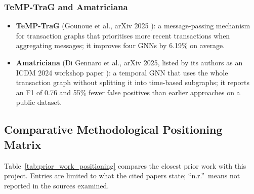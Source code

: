 \documentclass[11pt,a4paper]{article}
\begin{document}
\subsubsection{TeMP-TraG and Amatriciana}
\begin{itemize}[leftmargin=*]
    \item \textbf{TeMP-TraG} (Gounoue et al., arXiv 2025 \cite{gounoue2025tempt}): a message-passing mechanism for transaction graphs that prioritises more recent transactions when aggregating messages; it improves four GNNs by 6.19\% on average.
    \item \textbf{Amatriciana} (Di Gennaro et al., arXiv 2025, listed by its authors as an ICDM 2024 workshop paper \cite{digennaro2025amatriciana}): a temporal GNN that uses the whole transaction graph without splitting it into time-based subgraphs; it reports an F1 of 0.76 and 55\% fewer false positives than earlier approaches on a public dataset.
\end{itemize}

\subsection{Comparative Methodological Positioning Matrix}
Table~\ref{tab:prior_work_positioning} compares the closest prior work with this project. Entries are limited to what the cited papers state; ``n.r.''\ means not reported in the sources examined.
\end{document}

